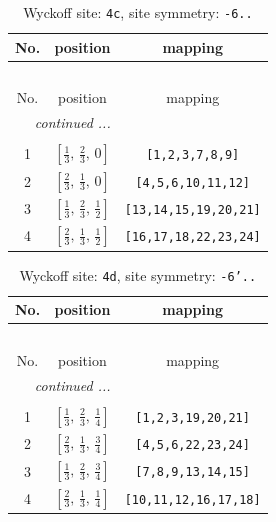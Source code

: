 \documentclass[fleqn,8pt]{jsarticle}
\begin{document}
\renewcommand{\arraystretch}{1.2}
\begin{longtable}{ccc}
\caption{Wyckoff site: {\tt 4c}, site symmetry: {\tt -6..}}
 \\
 \hline \hline
No. & position & mapping \\ \hline \endfirsthead

\multicolumn{2}{l}{\tablename\ \thetable{}} \\
 \hline \hline
No. & position & mapping \\ \hline \endhead

 \hline \hline
\multicolumn{2}{r}{\footnotesize\it continued ...} \\ \endfoot

 \hline \hline
\multicolumn{2}{r}{} \\ \endlastfoot

1 & $\left[ \frac{1}{3},\, \frac{2}{3},\, 0 \right]$ & {\tt [1,2,3,7,8,9]} \\ \hline
2 & $\left[ \frac{2}{3},\, \frac{1}{3},\, 0 \right]$ & {\tt [4,5,6,10,11,12]} \\ \hline
3 & $\left[ \frac{1}{3},\, \frac{2}{3},\, \frac{1}{2} \right]$ & {\tt [13,14,15,19,20,21]} \\ \hline
4 & $\left[ \frac{2}{3},\, \frac{1}{3},\, \frac{1}{2} \right]$ & {\tt [16,17,18,22,23,24]} \\
\end{longtable}
\renewcommand{\arraystretch}{1.2}
\begin{longtable}{ccc}
\caption{Wyckoff site: {\tt 4d}, site symmetry: {\tt -6'..}}
 \\
 \hline \hline
No. & position & mapping \\ \hline \endfirsthead

\multicolumn{2}{l}{\tablename\ \thetable{}} \\
 \hline \hline
No. & position & mapping \\ \hline \endhead

 \hline \hline
\multicolumn{2}{r}{\footnotesize\it continued ...} \\ \endfoot

 \hline \hline
\multicolumn{2}{r}{} \\ \endlastfoot

1 & $\left[ \frac{1}{3},\, \frac{2}{3},\, \frac{1}{4} \right]$ & {\tt [1,2,3,19,20,21]} \\ \hline
2 & $\left[ \frac{2}{3},\, \frac{1}{3},\, \frac{3}{4} \right]$ & {\tt [4,5,6,22,23,24]} \\ \hline
3 & $\left[ \frac{1}{3},\, \frac{2}{3},\, \frac{3}{4} \right]$ & {\tt [7,8,9,13,14,15]} \\ \hline
4 & $\left[ \frac{2}{3},\, \frac{1}{3},\, \frac{1}{4} \right]$ & {\tt [10,11,12,16,17,18]} \\
\end{longtable}
\end{document}
